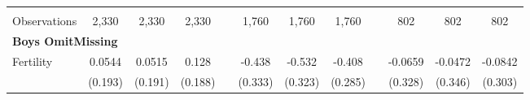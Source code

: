 \begin{landscape}
\begin{table}[htpb!]
\begin{center}
\begin{tabular}{lcccp{2mm}cccp{2mm}ccc}
\begin{footnotesize}\end{footnotesize}&\begin{footnotesize}\end{footnotesize}&\begin{footnotesize}\end{footnotesize}&\begin{footnotesize}\end{footnotesize}&\begin{footnotesize}\end{footnotesize}&\begin{footnotesize}\end{footnotesize}&\begin{footnotesize}\end{footnotesize}&\begin{footnotesize}\end{footnotesize}&\begin{footnotesize}\end{footnotesize}&\begin{footnotesize}\end{footnotesize}&\begin{footnotesize}\end{footnotesize}&\begin{footnotesize}\end{footnotesize}\\Observations&2,330&2,330&2,330&&1,760&1,760&1,760&&802&802&802\\
\multicolumn{12}{l}{\textbf{Boys OmitMissing}}\\ 
Fertility&0.0544&0.0515&0.128&&-0.438&-0.532&-0.408&&-0.0659&-0.0472&-0.0842\\
&(0.193)&(0.191)&(0.188)&&(0.333)&(0.323)&(0.285)&&(0.328)&(0.346)&(0.303)\\

\end{tabular}
\end{center}
\end{table}
\end{landscape}
